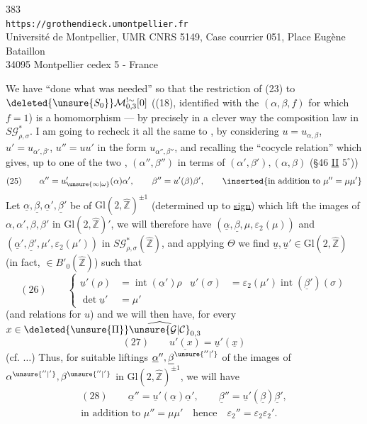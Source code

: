 \begin{center}
383\\
\texttt{https://grothendieck.umontpellier.fr}\\
Université de Montpellier, UMR CNRS 5149, Case courrier 051, Place Eugène Bataillon\\
34095 Montpellier cedex 5 - France
\end{center}

We have ``done what was needed'' so that the restriction of (23) to $\deleted{\unsure{S_0}}\mathcal M_{0,3}^{!\sim}[0]$ ((18), identified with the $(\alpha,\beta,f)$ for which $f=1$) is a homomorphism  --- by  precisely in a clever way  the composition law in $S\mathcal G_{\rho,\sigma}^{*}$.
I am going to recheck it all the same to , by considering $u=u_{\alpha,\beta}$, $u'=u_{\alpha',\beta'}$, $u''=uu'$ in the form $u_{\alpha'',\beta''}$, and recalling the ``cocycle relation'' which gives, up to one of the two , $(\alpha'',\beta'')$ in terms of $(\alpha',\beta'),(\alpha,\beta)$ (\S 46 \uline{II} $5^\circ$))
\[
(25)\qquad
\alpha''=u'_{\unsure{\infty|\omega}}(\alpha)\alpha',\qquad
\beta''=u'(\beta)\beta',\qquad
\inserted{\text{in addition to }\mu''=\mu\mu'}
\]
Let  $\underline\alpha,\underline\beta,\underline\alpha',\underline\beta'$ be   of $\mathrm{Gl}(2,\widehat{\mathbb Z})^{\pm1}$ (determined up to \uline{sign}) which lift the images of $\alpha,\alpha',\beta,\beta'$ in $\mathrm{Gl}(2,\widehat{\mathbb Z})'$, we will therefore have $(\underline\alpha,\underline\beta,\mu,\varepsilon_2(\mu))$ and $(\underline\alpha',\underline\beta',\mu',\varepsilon_2(\mu'))$ in $S\mathcal G_{\rho,\sigma}^{*}(\widehat{\mathbb Z})$, and applying $\Theta$ we find $\underline u,\underline u'\in\mathrm{Gl}(2,\widehat{\mathbb Z})$ (in fact, $\in B'_0(\widehat{\mathbb Z})$) such that
\[
(26)\qquad
\left\{\begin{aligned}
\underline u'(\rho)&=\operatorname{int}(\underline\alpha')\rho
&\underline u'(\sigma)&=\varepsilon_2(\mu')\operatorname{int}(\underline\beta')(\sigma)\\
\det\underline u'&=\mu'
\end{aligned}\right.
\]
(and relations  for $u$)
and we will then have, for every $x\in\deleted{\unsure{\Pi}}\widehat{\unsure{\mathcal G|\mathcal C}}_{0,3}$
\[
(27)\qquad \underline{u'(x)}=\underline u'(\underline x)
\]
(cf. $\ldots$) Thus, for  suitable liftings $\underline\alpha'',\underline\beta^{\unsure{''|'}}$ of the images of $\alpha^{\unsure{''|'}},\beta^{\unsure{''|'}}$ in $\mathrm{Gl}(2,\widehat{\mathbb Z})^{\pm1}$, we will have
\[
\begin{gathered}
(28)\qquad
\underline\alpha''=\underline u'(\underline\alpha)\underline\alpha',\qquad
\underline\beta''=\underline u'(\underline\beta)\underline\beta',\\
\text{in addition to }\mu''=\mu\mu'\quad\text{hence}\quad
\varepsilon_2''=\varepsilon_2\varepsilon_2'.
\end{gathered}
\]

